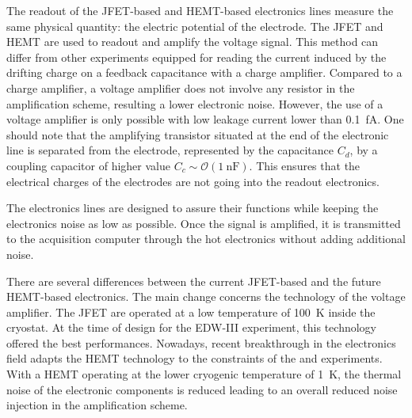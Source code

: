 The readout of the JFET-based and HEMT-based electronics lines measure the same physical quantity: the electric potential of the electrode. The JFET and HEMT are used to readout and amplify the voltage signal. This method can differ from other experiments equipped for reading the current induced by the drifting charge on a feedback capacitance with a charge amplifier. Compared to a charge amplifier, a voltage amplifier does not involve any resistor in the amplification scheme, resulting a lower electronic noise. However, the use of a voltage amplifier is only possible with low leakage current lower than \SI{0.1}{\femto\ampere}.
One should note that the amplifying transistor situated at the end of the electronic line is separated from the electrode, represented by the capacitance $C_d$, by a coupling capacitor of higher value $C_c \sim \mathcal{O}(\SI{1}{\nano\farad})$. This ensures that the electrical charges of the electrodes are not going into the readout electronics.

The electronics lines are designed to assure their functions while keeping the electronics noise as low as possible. Once the signal is amplified, it is transmitted to the acquisition computer through the hot electronics without adding additional noise.

There are several differences between the current JFET-based and the future HEMT-based electronics.
The main change concerns the technology of the voltage amplifier. The JFET are operated at a low temperature of \SI{100}{\kelvin} inside the cryostat. At the time of design for the EDW-III experiment, this technology offered the best performances. Nowadays, recent breakthrough in the electronics field adapts the HEMT technology to the constraints of the \Edelweiss{} and \Ricochet{} experiments. With a HEMT operating at the lower cryogenic temperature of \SI{1}{\kelvin}, the thermal noise of the electronic components is reduced leading to an overall reduced noise injection in the amplification scheme.

